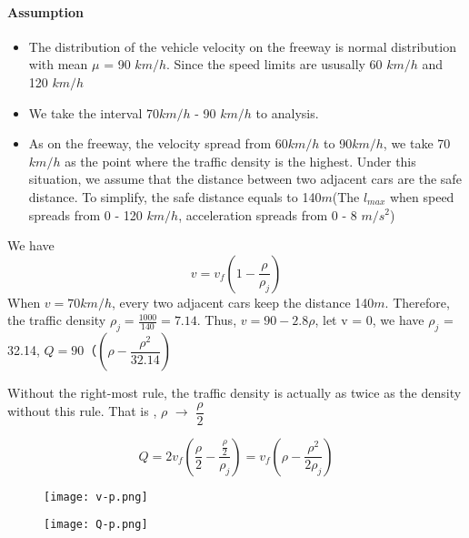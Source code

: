 \paragraph{Assumption}
\begin{itemize}
\item The distribution of the
vehicle velocity on the freeway
is normal distribution with mean
$\mu$ = 90 $km/h$. Since the speed 
limits are ususally 60 $km/h$ and 120 $km/h$
\item We take the interval 70$km/h$ - 90 $km/h$
to analysis.
\item As on the freeway, the velocity spread from
60$km/h$ to 90$km/h$, we take 70$km/h$ as the point where the traffic density is the highest.
Under this situation, we assume that the distance between two adjacent cars are the
safe distance. To simplify, the safe distance
equals to 140$m$(The $l_{max}$ when speed spreads from 0 - 120 $km/h$, acceleration spreads from 0 - 8 $m/s^2$)
\end{itemize}

We have 
\begin{equation}
v = v_f(1 - \frac{\rho}{\rho_j})
\end{equation}
When $v = 70km/h$, every two adjacent cars keep the distance 140$m$. Therefore,
the traffic density 
$\rho_j = \frac{1000}{140} = 7.14$.
Thus, $v = 90 - 2.8 \rho$,
let v = 0, we have
$\rho_j$ = 32.14,
$Q = 90（(\rho - \dfrac{\rho ^2}{32.14})$

Without the right-most rule, the traffic density
is actually as twice as the density without this
rule.
That is , $\rho$ $\rightarrow$ $\dfrac{\rho}{2}$

\begin{displaymath}
Q = 2v_f(\dfrac{\rho}{2} -\dfrac{\frac{\rho}{2}}{\rho_j})
= v_f(\rho - \dfrac{\rho^2}{2\rho _j})
\end{displaymath}

\begin{figure}[htbp]
\centering
\begin{minipage}{60pt}
\centering
	\texttt{[image: v-p.png]}
\end{minipage}
\hspace{10pt}
\begin{minipage}{60pt}
\centering
	\texttt{[image: Q-p.png]}
\end{minipage}
\end{figure}


